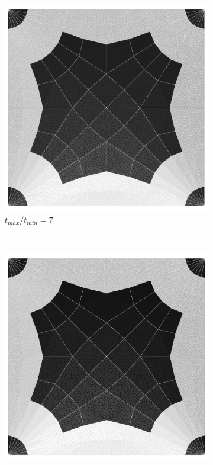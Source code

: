 \begin{figure}[H]
\begin{subfigure}[b]{.32\textwidth}
  \centering
  \includegraphics[width=.99\linewidth]{images/t_opt_l2d15_gamma7}
  \caption{$t_{max}/t_{min}=7$}
\end{subfigure}
~
\begin{subfigure}[b]{.32\textwidth}
  \centering
  \includegraphics[width=.99\linewidth]{images/t_opt_l2d15_gamma8}

\end{subfigure}
\end{figure}
